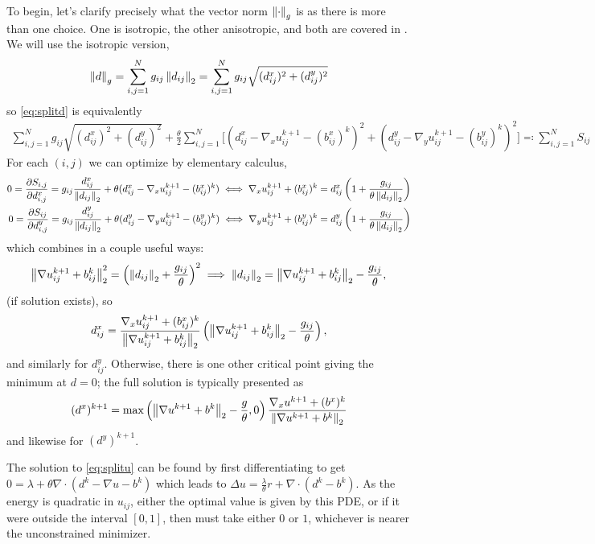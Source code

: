 To begin, let's clarify precisely what the vector norm $\left\lVert\cdot \right\rVert_g$ is as there is more than one choice. One is isotropic, the other anisotropic, and both are covered in \cite{goldstein2009split}. We will use the isotropic version, 
\begin{align*}
\left\lVert d \right\rVert_g 
= \sum^N_{i,j = 1} g_{ij} \left\lVert d_{ij}\right\rVert_2 
= \sum^{N}_{i,j = 1} g_{ij} \sqrt{ (d^x_{ij} )^2 + (d^y_{ij} )^2 }
\end{align*}
so \eqref{eq:splitd} is equivalently 
\begin{align*}
\sum^{N}_{i,j = 1} g_{ij} \sqrt{ (d^x_{ij} )^2 + (d^y_{ij} )^2 }
+ \frac{\theta}{2} \sum^N_{i,j=1} \big[ (d^x_{ij} - \nabla_x u^{k+1}_{ij} - (b^x_{ij})^k)^2 
+ (d^y_{ij} - \nabla_y u^{k+1}_{ij} - (b^y_{ij})^k)^2 
\big]
\eqqcolon \sum^N_{i,j=1} S_{ij}
\end{align*}
For each $(i,j)$ we can optimize by elementary calculus, 
\begin{align*}
0
=\frac{\partial S_{i,j}}{\partial d^x_{i,j}} 
= g_{ij}\frac{d^x_{ij}}{ \left\lVert d_{ij}\right\rVert_2}
+ \theta (d^x_{ij} - \nabla_x u^{k+1}_{ij} - (b^x_{ij})^k) 
\iff
\nabla_x u^{k+1}_{ij} + (b^x_{ij})^k  
= d^x_{ij} \left( 1 + \frac{g_{ij}}{\theta \left\lVert d_{ij}\right\rVert_2}
\right)
\\
0
=\frac{\partial S_{ij}}{\partial d^y_{i,j}} 
= g_{ij}\frac{d^y_{ij}}{ \left\lVert d_{ij}\right\rVert_2}
+ \theta (d^y_{ij} - \nabla_y u^{k+1}_{ij} - (b^y_{ij})^k) 
\iff
\nabla_y u^{k+1}_{ij} + (b^y_{ij})^k 
= d^y_{ij} \left( 1 + \frac{g_{ij}}{\theta\left\lVert d_{ij}\right\rVert_2}
\right)
\end{align*}
which combines in a couple useful ways:
\begin{align*}
\left\lVert\nabla u^{k+1}_{ij} + b^k_{ij}\right\rVert_2^2 = \left(\left\lVert d_{ij}\right\rVert_2 + \frac{g_{ij}}{\theta}
\right)^2
\implies 
\left\lVert d_{ij}\right\rVert_2 = \left\lVert\nabla u^{k+1}_{ij} + b^k_{ij} \right\rVert_2 - \frac{g_{ij}}{\theta},
\end{align*}
(if solution exists), so
\begin{align*}
d_{ij}^x 
= \frac{ \nabla_x u^{k+1}_{ij} + (b^x_{ij})^k }{ \left\lVert\nabla u^{k+1}_{ij} + b^k_{ij} \right\rVert_2} \left( \left\lVert\nabla u^{k+1}_{ij} + b^k_{ij} \right\rVert_2 - \frac{g_{ij}}{\theta} \right), 
\end{align*}
and similarly for $d^y_{ij}$. Otherwise, there is one other critical point giving the minimum at $d = 0$; the full solution is typically presented as 
\begin{align*}
(d^x)^{k+1} 
= \max\left( \left\lVert \nabla u^{k+1} + b^k\right\rVert_2 - \frac{g}{\theta}, 0 \right) \frac{ \nabla_x u^{k+1} + (b^x)^k}{ \left\lVert \nabla u^{k+1} + b^k\right\rVert_2}
\end{align*}
and likewise for $(d^y)^{k+1}$.

The solution to \eqref{eq:splitu} can be found by first differentiating to get $0 = \lambda  +\theta  \nabla \cdot ( d^k - \nabla u - b^k)$ which leads to $\Delta u = \frac{\lambda}{\theta} r + \nabla \cdot (d^k - b^k)$. As the energy is quadratic in $u_{ij}$, either the optimal value is given by this PDE, or if it were outside the interval $[0,1]$, then must take either $0$ or $1$, whichever is nearer the unconstrained minimizer. 

